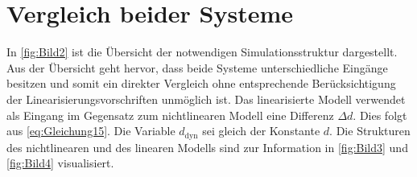 \section{Vergleich beider Systeme} \label{sec:Vergleich}
In \autoref{fig:Bild2} ist die Übersicht der notwendigen Simulationsstruktur dargestellt. Aus der Übersicht geht hervor, dass beide Systeme unterschiedliche Eingänge besitzen und somit ein direkter Vergleich ohne entsprechende Berücksichtigung der Linearisierungsvorschriften unmöglich ist. Das linearisierte Modell verwendet als Eingang im Gegensatz zum nichtlinearen Modell eine Differenz $\Delta d$. Dies folgt aus \autoref{eq:Gleichung15}. Die Variable $d_{\mathrm{dyn}}$ sei gleich der Konstante $d$. Die Strukturen des nichtlinearen und des linearen Modells sind zur Information in \autoref{fig:Bild3} und \autoref{fig:Bild4} visualisiert.

